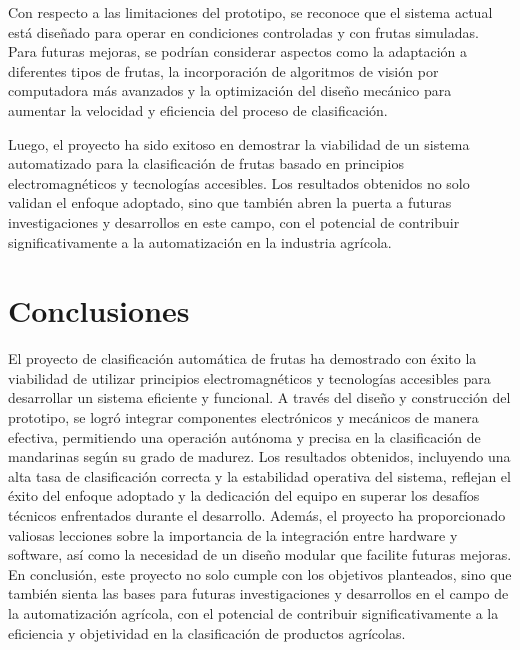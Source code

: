 Con respecto a las limitaciones del prototipo, se reconoce que el sistema actual está diseñado para operar en condiciones controladas y con frutas simuladas. Para futuras mejoras, se podrían considerar aspectos como la adaptación a diferentes tipos de frutas, la incorporación de algoritmos de visión por computadora más avanzados y la optimización del diseño mecánico para aumentar la velocidad y eficiencia del proceso de clasificación.

Luego, el proyecto ha sido exitoso en demostrar la viabilidad de un sistema automatizado para la clasificación de frutas basado en principios electromagnéticos y tecnologías accesibles. Los resultados obtenidos no solo validan el enfoque adoptado, sino que también abren la puerta a futuras investigaciones y desarrollos en este campo, con el potencial de contribuir significativamente a la automatización en la industria agrícola.

\newpage

\section{Conclusiones}

El proyecto de clasificación automática de frutas ha demostrado con éxito la viabilidad de utilizar principios electromagnéticos y tecnologías accesibles para desarrollar un sistema eficiente y funcional. A través del diseño y construcción del prototipo, se logró integrar componentes electrónicos y mecánicos de manera efectiva, permitiendo una operación autónoma y precisa en la clasificación de mandarinas según su grado de madurez. Los resultados obtenidos, incluyendo una alta tasa de clasificación correcta y la estabilidad operativa del sistema, reflejan el éxito del enfoque adoptado y la dedicación del equipo en superar los desafíos técnicos enfrentados durante el desarrollo. Además, el proyecto ha proporcionado valiosas lecciones sobre la importancia de la integración entre hardware y software, así como la necesidad de un diseño modular que facilite futuras mejoras. En conclusión, este proyecto no solo cumple con los objetivos planteados, sino que también sienta las bases para futuras investigaciones y desarrollos en el campo de la automatización agrícola, con el potencial de contribuir significativamente a la eficiencia y objetividad en la clasificación de productos agrícolas.